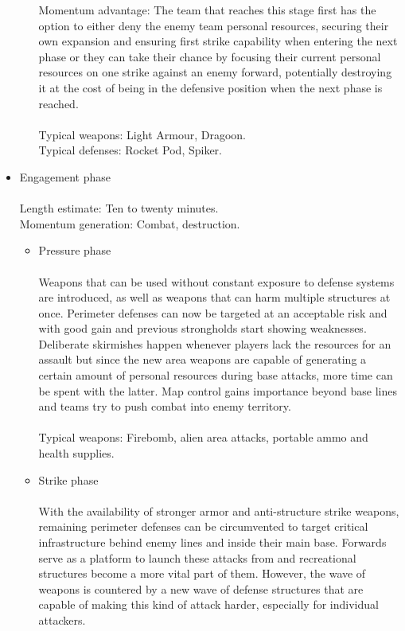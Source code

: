 \documentclass{scrartcl}
\begin{document}
\begin{itemize}
\begin{itemize}
			Momentum advantage: The team that reaches this stage first has the option to either deny the enemy team personal resources, securing their own expansion and ensuring first strike capability when entering the next phase or they can take their chance by focusing their current personal resources on one strike against an enemy forward, potentially destroying it at the cost of being in the defensive position when the next phase is reached. \\\\
			Typical weapons: Light Armour, Dragoon. \\
			Typical defenses: Rocket Pod, Spiker. \\
		\end{itemize}
	\item Engagement phase \\\\
		Length estimate: Ten to twenty minutes. \\
		Momentum generation: Combat, destruction. \\
		\begin{itemize}
		\item Pressure phase \\\\
			Weapons that can be used without constant exposure to defense systems are introduced, as well as weapons that can harm multiple structures at once. Perimeter defenses can now be targeted at an acceptable risk and with good gain and previous strongholds start showing weaknesses. Deliberate skirmishes happen whenever players lack the resources for an assault but since the new area weapons are capable of generating a certain amount of personal resources during base attacks, more time can be spent with the latter. Map control gains importance beyond base lines and teams try to push combat into enemy territory. \\\\
			Typical weapons: Firebomb, alien area attacks, portable ammo and health supplies. \\
		\item Strike phase \\\\
			With the availability of stronger armor and anti-structure strike weapons, remaining perimeter defenses can be circumvented to target critical infrastructure behind enemy lines and inside their main base. Forwards serve as a platform to launch these attacks from and recreational structures become a more vital part of them. However, the wave of weapons is countered by a new wave of defense structures that are capable of making this kind of attack harder, especially for individual attackers. \\\\

\end{itemize}
\end{itemize}
\end{document}
